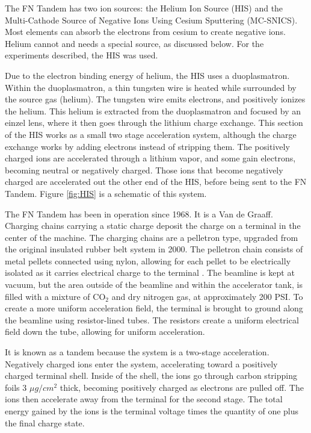 The FN Tandem has two ion sources: the Helium Ion Source (HIS) and the Multi-Cathode Source of Negative Ions Using Cesium Sputtering (MC-SNICS). Most elements can absorb the electrons from cesium to create negative ions. Helium cannot and needs a special source, as discussed below. For the experiments described, the HIS was used.

Due to the electron binding energy of helium, the HIS uses a duoplasmatron. Within the duoplasmatron, a thin tungsten wire is heated while surrounded by the source gas (helium). The tungsten wire emits electrons, and positively ionizes the helium. This helium is extracted from the duoplasmatron and focused by an einzel lens, where it then goes through the lithium charge exchange. This section of the HIS works as a small two stage acceleration system, although the charge exchange works by adding electrons instead of stripping them. The positively charged ions are accelerated through a lithium vapor, and some gain electrons, becoming neutral or negatively charged. Those ions that become negatively charged are accelerated out the other end of the HIS, before being sent to the FN Tandem. Figure \ref{fig:HIS} is a schematic of this system.



The FN Tandem has been in operation since 1968. It is a Van de Graaff. Charging chains carrying a static charge deposit the charge on a terminal in the center of the machine. The charging chains are a pelletron type, upgraded from the original insulated rubber belt system in 2000. The pelletron chain consists of metal pellets connected using nylon, allowing for each pellet to be electrically isolated as it carries electrical charge to the terminal \citep{nec:_pelletron}. The beamline is kept at vacuum, but the area outside of the beamline and within the accelerator tank, is filled with a mixture of CO$_2$ and dry nitrogen gas, at approximately 200 PSI. To create a more uniform acceleration field, the terminal is brought to ground along the beamline using resistor-lined tubes. The resistors create a uniform electrical field down the tube, allowing for uniform acceleration.

It is known as a tandem because the system is a two-stage acceleration. Negatively charged ions enter the system, accelerating toward a positively charged terminal shell. Inside of the shell, the ions go through carbon stripping foils 3 $\mu g/cm^2$ thick, becoming positively charged as electrons are pulled off. The ions then accelerate away from the terminal for the second stage. The total energy gained by the ions is the terminal voltage times the quantity of one plus the final charge state.

